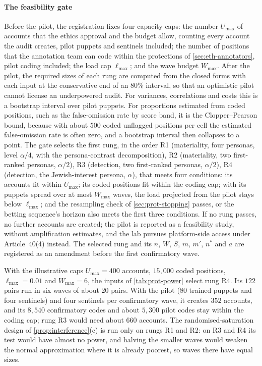 \paragraph{The feasibility gate}
Before the pilot, the registration fixes four capacity caps: the number $U_{\max}$ of accounts that the ethics approval and the budget allow, counting every account the audit creates, pilot puppets and sentinels included; the number of positions that the annotation team can code within the protections of \cref{sec:eth-annotators}, pilot coding included; the load cap $\ell_{\max}$; and the wave budget $W_{\max}$. After the pilot, the required sizes of each rung are computed from the closed forms with each input at the conservative end of an $80\%$ interval, so that an optimistic pilot cannot license an underpowered audit. For variances, correlations and costs this is a bootstrap interval over pilot puppets. For proportions estimated from coded positions, such as the false-omission rate by score band, it is the Clopper--Pearson bound, because with about $500$ coded unflagged positions per cell the estimated false-omission rate is often zero, and a bootstrap interval then collapses to a point. The gate selects the first rung, in the order R1 (materiality, four personas, level $\alpha/4$, with the persona-contrast decomposition), R2 (materiality, two first-ranked personas, $\alpha/2$), R3 (detection, two first-ranked personas, $\alpha/2$), R4 (detection, the Jewish-interest persona, $\alpha$), that meets four conditions: its accounts fit within $U_{\max}$; its coded positions fit within the coding cap; with its puppets spread over at most $W_{\max}$ waves, the load projected from the pilot stays below $\ell_{\max}$; and the resampling check of \cref{sec:prot-stopping} passes, or the betting sequence's horizon also meets the first three conditions. If no rung passes, no further accounts are created; the pilot is reported as a feasibility study, without amplification estimates, and the lab pursues platform-side access under Article~40(4) instead. The selected rung and its $n$, $W$, $S$, $m$, $m'$, $n^\ast$ and $a$ are registered as an amendment before the first confirmatory wave.

With the illustrative caps $U_{\max}=400$ accounts, $15{,}000$ coded positions, $\ell_{\max}=0.01$ and $W_{\max}=6$, the inputs of \cref{tab:prot-power} select rung R4. Its $122$ pairs run in six waves of about $20$ pairs. With the pilot ($80$ trained puppets and four sentinels) and four sentinels per confirmatory wave, it creates $352$ accounts, and its $8{,}540$ confirmatory codes and about $5{,}300$ pilot codes stay within the coding cap; rung R3 would need about $660$ accounts. The randomised-saturation design of \cref{prop:interference}(c) is run only on rungs R1 and R2: on R3 and R4 its test would have almost no power, and halving the smaller waves would weaken the normal approximation where it is already poorest, so waves there have equal sizes.

